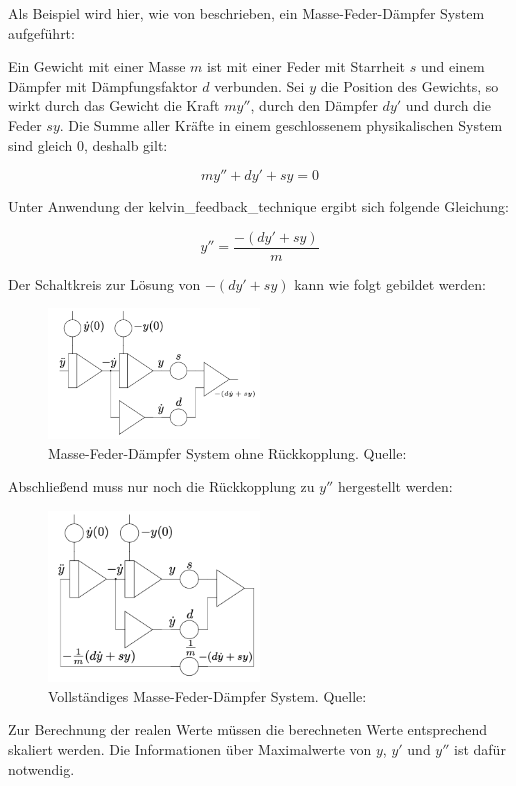 Als Beispiel wird hier, wie von \cite[S. 168 ff.]{Ulmann2022} beschrieben, ein Masse-Feder-Dämpfer System aufgeführt:

Ein Gewicht mit einer Masse \(m\) ist mit einer Feder mit Starrheit \(s\) und einem Dämpfer mit Dämpfungsfaktor \(d\) verbunden. Sei \(y\) die Position des Gewichts, so wirkt durch das Gewicht die Kraft \(my''\), durch den Dämpfer \(dy'\) und durch die Feder \(sy\). Die Summe aller Kräfte in einem geschlossenem physikalischen System sind gleich 0, deshalb gilt:

\[my''+dy'+sy=0\]

Unter Anwendung der \gls{kelvin_feedback_technique} ergibt sich folgende Gleichung:

\[y''=\frac{-(dy'+sy)}{m}\]

Der Schaltkreis zur Lösung von \(-(dy'+sy)\) kann wie folgt gebildet werden:

\begin{figure}[h]
  \includegraphics[width=0.5\textwidth]{abbildungen/feder_masse_daempfer.png}
  \caption{Masse-Feder-Dämpfer System ohne Rückkopplung. Quelle: \cite[S. 170]{Ulmann2022}}
  \label{fig:Feder-Masse-Dämpfer System}
\end{figure}

Abschließend muss nur noch die Rückkopplung zu \(y''\) hergestellt werden:

\begin{figure}[h]
  \includegraphics[width=0.5\textwidth]{abbildungen/feder_masse_daempfer_mit_rueckkopplung.png}
  \caption{Vollständiges Masse-Feder-Dämpfer System. Quelle: \cite[S. 170]{Ulmann2022}}
  \label{fig:Feder-Masse-Dämpfer System mit Rückkopplung}
\end{figure}

Zur Berechnung der realen Werte müssen die berechneten Werte entsprechend skaliert werden. Die Informationen über Maximalwerte von \(y\), \(y'\) und \(y''\) ist dafür notwendig.
